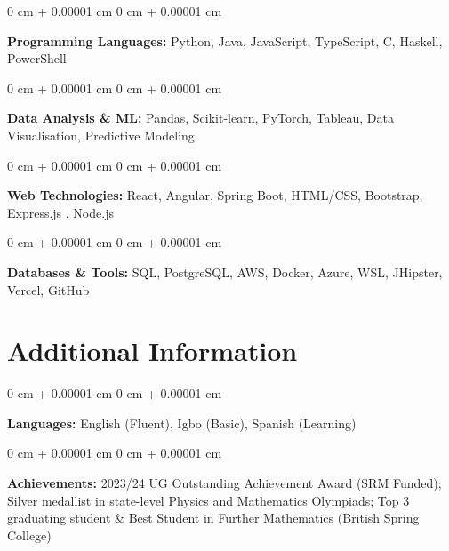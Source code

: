 \documentclass[10pt, a4paper]{article}
\newenvironment{onecolentry}{
    \begin{adjustwidth}{
        0 cm + 0.00001 cm
    }{
        0 cm + 0.00001 cm
    }
}{
    \end{adjustwidth}
} %
\begin{document}
    \begin{onecolentry}
        \textbf{Programming Languages:} Python, Java, JavaScript, TypeScript, C, Haskell, PowerShell
    \end{onecolentry}

    \vspace{0.2 cm}

    \begin{onecolentry}
        \textbf{Data Analysis \& ML:} Pandas, Scikit-learn, PyTorch, Tableau, Data Visualisation, Predictive Modeling
    \end{onecolentry}

    \vspace{0.2 cm}

    \begin{onecolentry}
        \textbf{Web Technologies:} React, Angular, Spring Boot, HTML/CSS, Bootstrap, Express.js , Node.js
    \end{onecolentry}

    \vspace{0.2 cm}

    \begin{onecolentry}
        \textbf{Databases \& Tools:} SQL, PostgreSQL, AWS, Docker, Azure, WSL, JHipster, Vercel, GitHub
    \end{onecolentry}

    \vspace{0.2 cm}

    \section{Additional Information}

    \begin{onecolentry}
        \textbf{Languages:} English (Fluent), Igbo (Basic), Spanish (Learning)
    \end{onecolentry}

    \vspace{0.1 cm}



    \begin{onecolentry}
        \textbf{Achievements:} 2023/24 UG Outstanding Achievement Award (SRM Funded); Silver medallist in state-level Physics and Mathematics Olympiads; Top 3 graduating student \& Best Student in Further Mathematics (British Spring College)
    \end{onecolentry}

    \vspace{0.2 cm}
\end{document}
